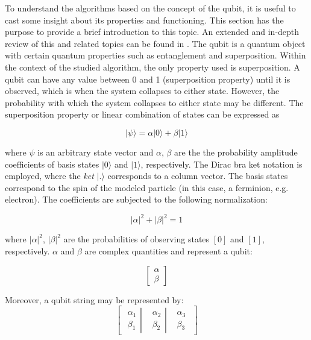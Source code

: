 To understand the algorithms based on the concept of the qubit, it is useful to cast some insight about its properties and functioning.
This section has the purpose to provide a brief introduction to this topic.
An extended and in-depth review of this and related topics can be found in \citet{Lanzagorta2008}.
The qubit is a quantum object with certain quantum properties such as entanglement and superposition.
Within the context of the studied algorithm, the only property used is superposition.
A qubit can have any value between 0 and 1 (superposition property) until it is observed, which is when the system collapses to either state.
However, the probability with which the system collapses to either state  may be different.
The superposition property or linear combination of states can be expressed \cite{Casper2012KMeans} as %


$$
| \psi \rangle = \alpha | 0 \rangle + \beta | 1 \rangle
$$

where $\psi$ is an arbitrary state vector and $\alpha$, $\beta$ are the the probability amplitude coefficients of basis states $| 0 \rangle$ and $| 1 \rangle$, respectively.
The Dirac bra ket notation is employed, where the \emph{ket} $| . \rangle$ corresponds to a column vector.
The basis states correspond to the spin of the modeled particle (in this case, a ferminion, e.g. electron).
The coefficients are subjected to the following normalization:

$$|\alpha|^2 + |\beta|^2 = 1$$

where $|\alpha|^2$, $|\beta|^2$ are the probabilities of observing states $[0]$ and $[1]$, respectively. $\alpha$ and $\beta$ are complex quantities and represent a qubit:

$$\begin{bmatrix}
\alpha \\
\beta
\end{bmatrix}$$

Moreover, a qubit string may be represented by:
$$
\begin{bmatrix}
\left. \begin{matrix}
\alpha_1\\ 
\beta_1
\end{matrix}\right| & \left.\begin{matrix}
\alpha_2\\ 
\beta_2
\end{matrix}\right| & \begin{matrix}
\alpha_3\\ 
\beta_3
\end{matrix}
\end{bmatrix}
$$

